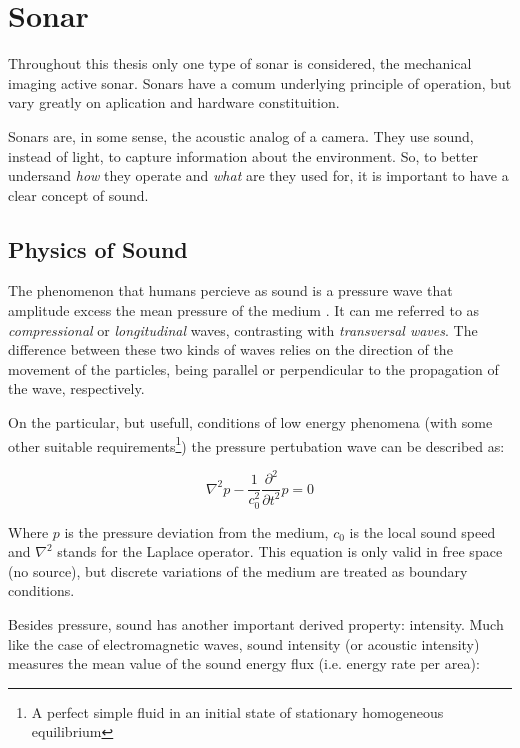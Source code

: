 \section{Sonar}

Throughout this thesis only one type of sonar is considered, the mechanical
imaging active sonar. Sonars have a comum underlying principle of operation, but
vary greatly on aplication and hardware constituition.

Sonars are, in some sense, the acoustic analog of a camera. They use sound,
instead of light, to capture information about the environment. So, to better
undersand \textit{how} they operate and \textit{what} are they used for, it is
important to have a clear concept of sound.

\subsection{Physics of Sound}

The phenomenon that humans percieve as sound is a pressure wave that amplitude
excess the mean pressure of the medium \cite{FEYNMAN}. It can me referred to as
\textit{compressional} or \textit{longitudinal} waves, contrasting with
\textit{transversal waves}. The difference between these two kinds of waves
relies on the direction of the movement of the particles, being parallel or
perpendicular to the propagation of the wave, respectively\cite{BRUNEAU}.

On the particular, but usefull, conditions of low energy
phenomena\cite{Lefebvre} (with some other suitable requirements\footnote{A
perfect simple fluid in an initial state of stationary homogeneous equilibrium})
the pressure pertubation wave can be described as:
 
\begin{equation}\label{eq:laplace}
\nabla^2 p - \frac{1}{c^2_0}\frac{\partial^2}{\partial t^2} p = 0
\end{equation}
 
Where $p$ is the pressure deviation from the medium, $c_0$ is the local
sound speed and $\nabla^2$ stands for the Laplace operator. This equation is
only valid in free space (no source), but discrete variations of the medium are
treated as boundary conditions.

Besides pressure, sound has another important derived property: intensity. Much
like the case of electromagnetic waves, sound intensity (or acoustic intensity)
measures the mean value of the sound energy flux (i.e. energy rate
per area):

